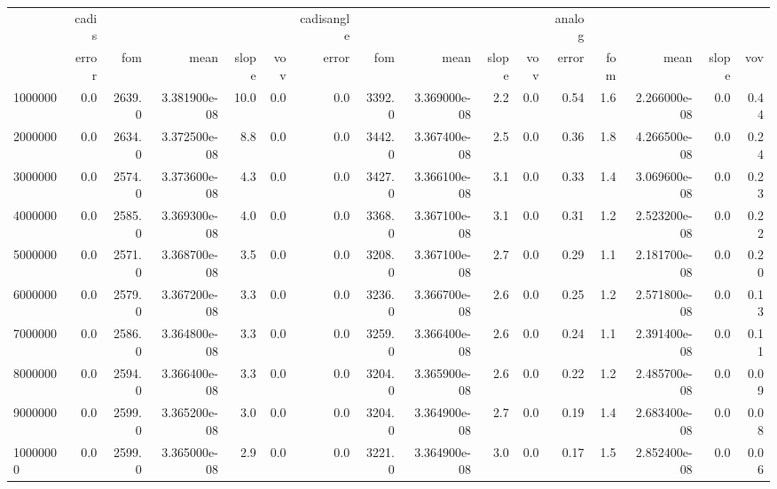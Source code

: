 \begin{tabular}{lrrrrrrrrrrrrrrr}
\toprule
{} & cadis &        &               &       &     & cadisangle &        &               &       &     & analog &     &               &       &      \\
{} & error &    fom &          mean & slope & vov &      error &    fom &          mean & slope & vov &  error & fom &          mean & slope &  vov \\
\midrule
1000000  &   0.0 & 2639.0 &  3.381900e-08 &  10.0 & 0.0 &        0.0 & 3392.0 &  3.369000e-08 &   2.2 & 0.0 &   0.54 & 1.6 &  2.266000e-08 &   0.0 & 0.44 \\
2000000  &   0.0 & 2634.0 &  3.372500e-08 &   8.8 & 0.0 &        0.0 & 3442.0 &  3.367400e-08 &   2.5 & 0.0 &   0.36 & 1.8 &  4.266500e-08 &   0.0 & 0.24 \\
3000000  &   0.0 & 2574.0 &  3.373600e-08 &   4.3 & 0.0 &        0.0 & 3427.0 &  3.366100e-08 &   3.1 & 0.0 &   0.33 & 1.4 &  3.069600e-08 &   0.0 & 0.23 \\
4000000  &   0.0 & 2585.0 &  3.369300e-08 &   4.0 & 0.0 &        0.0 & 3368.0 &  3.367100e-08 &   3.1 & 0.0 &   0.31 & 1.2 &  2.523200e-08 &   0.0 & 0.22 \\
5000000  &   0.0 & 2571.0 &  3.368700e-08 &   3.5 & 0.0 &        0.0 & 3208.0 &  3.367100e-08 &   2.7 & 0.0 &   0.29 & 1.1 &  2.181700e-08 &   0.0 & 0.20 \\
6000000  &   0.0 & 2579.0 &  3.367200e-08 &   3.3 & 0.0 &        0.0 & 3236.0 &  3.366700e-08 &   2.6 & 0.0 &   0.25 & 1.2 &  2.571800e-08 &   0.0 & 0.13 \\
7000000  &   0.0 & 2586.0 &  3.364800e-08 &   3.3 & 0.0 &        0.0 & 3259.0 &  3.366400e-08 &   2.6 & 0.0 &   0.24 & 1.1 &  2.391400e-08 &   0.0 & 0.11 \\
8000000  &   0.0 & 2594.0 &  3.366400e-08 &   3.3 & 0.0 &        0.0 & 3204.0 &  3.365900e-08 &   2.6 & 0.0 &   0.22 & 1.2 &  2.485700e-08 &   0.0 & 0.09 \\
9000000  &   0.0 & 2599.0 &  3.365200e-08 &   3.0 & 0.0 &        0.0 & 3204.0 &  3.364900e-08 &   2.7 & 0.0 &   0.19 & 1.4 &  2.683400e-08 &   0.0 & 0.08 \\
10000000 &   0.0 & 2599.0 &  3.365000e-08 &   2.9 & 0.0 &        0.0 & 3221.0 &  3.364900e-08 &   3.0 & 0.0 &   0.17 & 1.5 &  2.852400e-08 &   0.0 & 0.06 \\
\bottomrule
\end{tabular}
